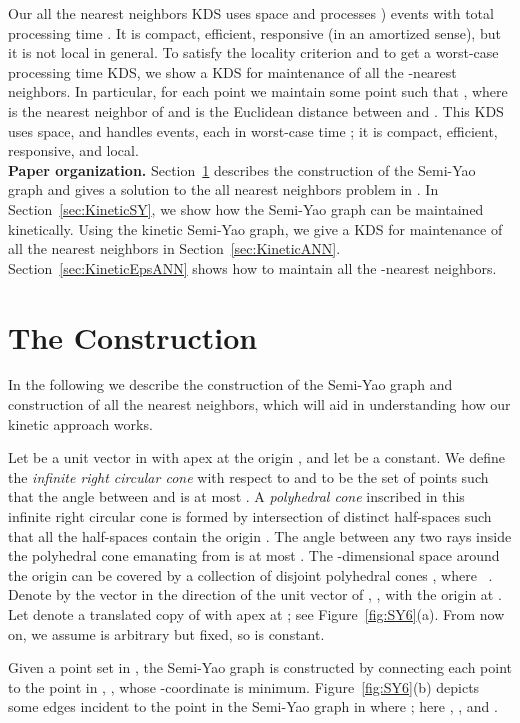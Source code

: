 \documentclass[11pt]{llncs}
\begin{document}
Our all the nearest neighbors KDS uses  space and processes ) events with total processing time .  It is compact, efficient, responsive (in an amortized sense), but it is not local in general. To satisfy the locality criterion and to get a worst-case processing time KDS, we show a KDS for maintenance of all the -nearest neighbors. In particular, for each point  we maintain some point  such that , where  is the nearest neighbor of  and  is the Euclidean distance between  and . This KDS uses  space, and handles  events, each in worst-case time ; it is compact, efficient, responsive, and local.
\vspace{+5pt}
\\
\textbf{Paper organization.}
Section~\ref{sec:prelininary} describes the construction of the Semi-Yao graph and gives a solution to the all nearest neighbors problem in . In Section~\ref{sec:KineticSY}, we show how the Semi-Yao graph can be maintained kinetically. Using the kinetic Semi-Yao graph, we give a KDS for maintenance of all the nearest neighbors in Section~\ref{sec:KineticANN}. Section~\ref{sec:KineticEpsANN} shows how to maintain all the -nearest neighbors.\section{The Construction}\label{sec:prelininary}
In the following we describe the construction of the Semi-Yao graph and construction of all the nearest neighbors, which will aid in understanding how our kinetic approach works.

Let  be a unit vector in  with apex at the origin , and let  be a constant. We define the \textit{infinite right circular cone} with respect to  and  to be the set of points  such that the angle between  and  is at most . A \textit{polyhedral cone} inscribed in this infinite right circular cone is formed by intersection of  distinct half-spaces such that all the half-spaces contain the origin . The angle between any two rays inside the polyhedral cone emanating from  is at most . 
The -dimensional space around the origin  can be covered by a collection of disjoint polyhedral cones , where ~\cite{Agarwal:2008:KDD:1435375.1435379,Abam:2011:KSX:1971362.1971367}. Denote by  the vector in the direction of the unit vector  of , ,  with the origin at . Let  denote a translated copy of  with apex at ; see Figure~\ref{fig:SY6}(a). From now on, we assume  is arbitrary but fixed, so  is constant.

Given a point set  in , the Semi-Yao graph is constructed by connecting each point  to the point in , , whose -coordinate is minimum. Figure~\ref{fig:SY6}(b) depicts some edges incident to the point  in the Semi-Yao graph in  where ; here , , and .
\end{document}
